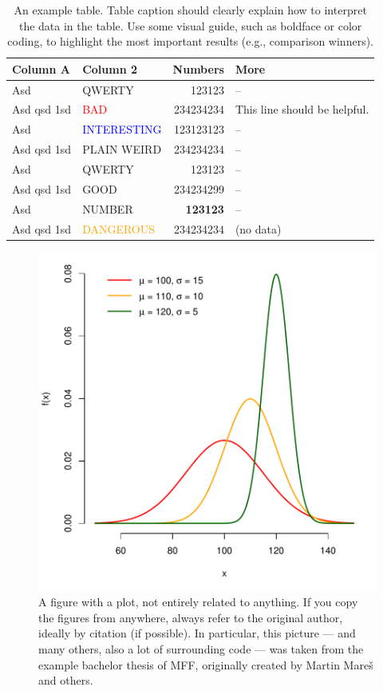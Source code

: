 \begin{table}
\centering\footnotesize\sf
\begin{tabular}{llrl}
\toprule
Column A & Column 2 & Numbers & More \\
\midrule
Asd & QWERTY & 123123 & -- \\
Asd qsd 1sd & \textcolor{red}{BAD} & 234234234 & This line should be helpful. \\
Asd & \textcolor{blue}{INTERESTING} & 123123123 & -- \\
Asd qsd 1sd & \textcolor{violet!50}{PLAIN WEIRD} & 234234234 & -- \\
Asd & QWERTY & 123123 & -- \\
\addlinespace %
Asd qsd 1sd & \textcolor{green!80!black}{GOOD} & 234234299 & -- \\
Asd & NUMBER & \textbf{123123} & -- \\
Asd qsd 1sd & \textcolor{orange}{DANGEROUS} & 234234234 & (no data) \\
\bottomrule
\end{tabular}
\caption{An example table.  Table caption should clearly explain how to interpret the data in the table. Use some visual guide, such as boldface or color coding, to highlight the most important results (e.g., comparison winners).}
\label{tab:z}
\end{table}

\begin{figure}
\centering
\includegraphics[width=.6\linewidth]{img/ukazka-obr02.pdf}
\caption{A figure with a plot, not entirely related to anything. If you copy the figures from anywhere, always refer to the original author, ideally by citation (if possible). In particular, this picture --- and many others, also a lot of surrounding code --- was taken from the example bachelor thesis of MFF, originally created by Martin Mareš and others.}
\label{fig:g}
\end{figure}

